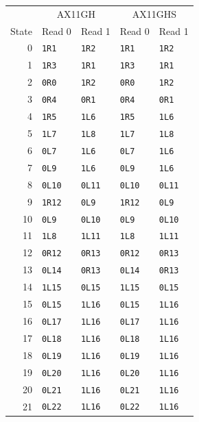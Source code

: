 {\small\setlength{\tabcolsep}{12pt}
\begin{longtable}{rllll}\toprule
&\multicolumn{2}{c}{AX11GH}&\multicolumn{2}{c}{AX11GHS}\\
State&Read 0&Read 1&Read 0&Read 1\\\midrule\endhead
0 & \texttt{1R1} & \texttt{1R2} & \texttt{1R1} & \texttt{1R2}\\
1 & \texttt{1R3} & \texttt{1R1} & \texttt{1R3} & \texttt{1R1}\\
2 & \texttt{0R0} & \texttt{1R2} & \texttt{0R0} & \texttt{1R2}\\
3 & \texttt{0R4} & \texttt{0R1} & \texttt{0R4} & \texttt{0R1}\\
4 & \texttt{1R5} & \texttt{1L6} & \texttt{1R5} & \texttt{1L6}\\
5 & \texttt{1L7} & \texttt{1L8} & \texttt{1L7} & \texttt{1L8}\\
6 & \texttt{0L7} & \texttt{1L6} & \texttt{0L7} & \texttt{1L6}\\
7 & \texttt{0L9} & \texttt{1L6} & \texttt{0L9} & \texttt{1L6}\\
8 & \texttt{0L10} & \texttt{0L11} & \texttt{0L10} & \texttt{0L11}\\
9 & \texttt{1R12} & \texttt{0L9} & \texttt{1R12} & \texttt{0L9}\\
10 & \texttt{0L9} & \texttt{0L10} & \texttt{0L9} & \texttt{0L10}\\
11 & \texttt{1L8} & \texttt{1L11} & \texttt{1L8} & \texttt{1L11}\\
12 & \texttt{0R12} & \texttt{0R13} & \texttt{0R12} & \texttt{0R13}\\
13 & \texttt{0L14} & \texttt{0R13} & \texttt{0L14} & \texttt{0R13}\\
14 & \texttt{1L15} & \texttt{0L15} & \texttt{1L15} & \texttt{0L15}\\
15 & \texttt{0L15} & \texttt{1L16} & \texttt{0L15} & \texttt{1L16}\\
16 & \texttt{0L17} & \texttt{1L16} & \texttt{0L17} & \texttt{1L16}\\
17 & \texttt{0L18} & \texttt{1L16} & \texttt{0L18} & \texttt{1L16}\\
18 & \texttt{0L19} & \texttt{1L16} & \texttt{0L19} & \texttt{1L16}\\
19 & \texttt{0L20} & \texttt{1L16} & \texttt{0L20} & \texttt{1L16}\\
20 & \texttt{0L21} & \texttt{1L16} & \texttt{0L21} & \texttt{1L16}\\
21 & \texttt{0L22} & \texttt{1L16} & \texttt{0L22} & \texttt{1L16}\\

\end{longtable}}
